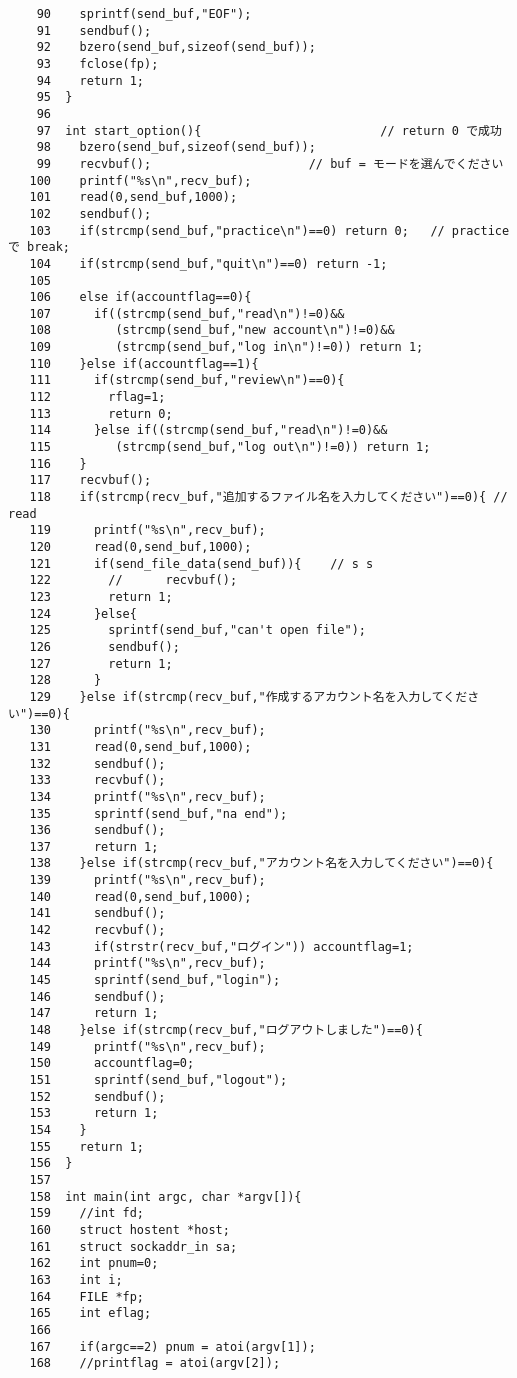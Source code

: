 \documentclass[a4j]{jarticle}
\begin{document}
{\begin{verbatim}
    90	  sprintf(send_buf,"EOF");
    91	  sendbuf();
    92	  bzero(send_buf,sizeof(send_buf));
    93	  fclose(fp);
    94	  return 1;
    95	}
    96	
    97	int start_option(){                         // return 0 で成功
    98	  bzero(send_buf,sizeof(send_buf));
    99	  recvbuf();                      // buf = モードを選んでください
   100	  printf("%s\n",recv_buf);
   101	  read(0,send_buf,1000);
   102	  sendbuf();
   103	  if(strcmp(send_buf,"practice\n")==0) return 0;   // practice で break;
   104	  if(strcmp(send_buf,"quit\n")==0) return -1;
   105	
   106	  else if(accountflag==0){
   107	    if((strcmp(send_buf,"read\n")!=0)&&
   108	       (strcmp(send_buf,"new account\n")!=0)&&
   109	       (strcmp(send_buf,"log in\n")!=0)) return 1;
   110	  }else if(accountflag==1){
   111	    if(strcmp(send_buf,"review\n")==0){
   112	      rflag=1;
   113	      return 0;
   114	    }else if((strcmp(send_buf,"read\n")!=0)&&
   115	       (strcmp(send_buf,"log out\n")!=0)) return 1;
   116	  }
   117	  recvbuf();
   118	  if(strcmp(recv_buf,"追加するファイル名を入力してください")==0){ // read
   119	    printf("%s\n",recv_buf);
   120	    read(0,send_buf,1000);
   121	    if(send_file_data(send_buf)){    // s s
   122	      //      recvbuf();
   123	      return 1;
   124	    }else{
   125	      sprintf(send_buf,"can't open file");
   126	      sendbuf();
   127	      return 1;
   128	    }
   129	  }else if(strcmp(recv_buf,"作成するアカウント名を入力してください")==0){
   130	    printf("%s\n",recv_buf);
   131	    read(0,send_buf,1000);
   132	    sendbuf();
   133	    recvbuf();
   134	    printf("%s\n",recv_buf);
   135	    sprintf(send_buf,"na end");
   136	    sendbuf();
   137	    return 1;
   138	  }else if(strcmp(recv_buf,"アカウント名を入力してください")==0){
   139	    printf("%s\n",recv_buf);
   140	    read(0,send_buf,1000);
   141	    sendbuf();
   142	    recvbuf();
   143	    if(strstr(recv_buf,"ログイン")) accountflag=1;
   144	    printf("%s\n",recv_buf);
   145	    sprintf(send_buf,"login");
   146	    sendbuf();
   147	    return 1;
   148	  }else if(strcmp(recv_buf,"ログアウトしました")==0){
   149	    printf("%s\n",recv_buf);
   150	    accountflag=0;
   151	    sprintf(send_buf,"logout");
   152	    sendbuf();
   153	    return 1;
   154	  }
   155	  return 1;
   156	} 
   157	
   158	int main(int argc, char *argv[]){
   159	  //int fd;
   160	  struct hostent *host;
   161	  struct sockaddr_in sa;
   162	  int pnum=0;
   163	  int i;
   164	  FILE *fp;
   165	  int eflag;
   166	
   167	  if(argc==2) pnum = atoi(argv[1]);
   168	  //printflag = atoi(argv[2]);

\end{verbatim}}
\end{document}
